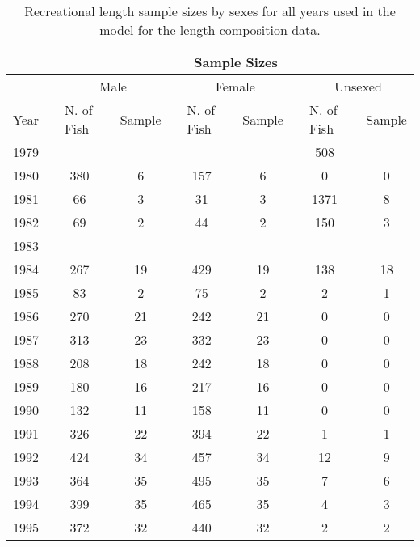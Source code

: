 \begingroup\fontsize{10}{12}\selectfont
\begingroup\fontsize{10}{12}\selectfont

\begin{table}[]
\caption{Recreational length sample sizes by sexes for all years used in the model for the length composition data.}
\label{tab:rec_length_sample}
\begin{tabular}{rlclclclclclc}
\hline
\multicolumn{1}{l}{} &  & \multicolumn{11}{c}{Sample Sizes} \\ \hline
\multicolumn{1}{l}{} &  & \multicolumn{3}{c}{Male} &  & \multicolumn{3}{c}{Female} &  & \multicolumn{3}{c}{Unsexed} \\ \cline{3-5} \cline{7-9} \cline{11-13} 
\multicolumn{1}{l}{Year} &  & \multicolumn{1}{l}{N. of  Fish} &  & \multicolumn{1}{l}{Sample} &  & \multicolumn{1}{l}{N. of Fish} &  & \multicolumn{1}{l}{Sample} &  & \multicolumn{1}{l}{N. of Fish} &  & \multicolumn{1}{l}{Sample} \\ \hline
1979 &  &  &  &  &  &  &  &  &  & 508 &  &  \\
1980 &  & 380 &  & 6 &  & 157 &  & 6 &  & 0 &  & 0 \\
1981 &  & 66 &  & 3 &  & 31 &  & 3 &  & 1371 &  & 8 \\
1982 &  & 69 &  & 2 &  & 44 &  & 2 &  & 150 &  & 3 \\
1983 &  &  &  &  &  &  &  &  &  &  &  &  \\
1984 &  & 267 &  & 19 &  & 429 &  & 19 &  & 138 &  & 18 \\
1985 &  & 83 &  & 2 &  & 75 &  & 2 &  & 2 &  & 1 \\
1986 &  & 270 &  & 21 &  & 242 &  & 21 & \multicolumn{1}{c}{} & 0 &  & 0 \\
1987 &  & 313 &  & 23 &  & 332 &  & 23 &  & 0 &  & 0 \\
1988 &  & 208 &  & 18 &  & 242 &  & 18 &  & 0 &  & 0 \\
1989 &  & 180 &  & 16 &  & 217 &  & 16 &  & 0 &  & 0 \\
1990 &  & 132 &  & 11 &  & 158 &  & 11 & \multicolumn{1}{c}{} & 0 &  & 0 \\
1991 &  & 326 &  & 22 &  & 394 &  & 22 & \multicolumn{1}{c}{} & 1 &  & 1 \\
1992 &  & 424 &  & 34 &  & 457 &  & 34 & \multicolumn{1}{c}{} & 12 &  & 9 \\
1993 &  & 364 &  & 35 &  & 495 &  & 35 &  & 7 &  & 6 \\
1994 &  & 399 &  & 35 &  & 465 &  & 35 &  & 4 &  & 3 \\
1995 &  & 372 &  & 32 &  & 440 &  & 32 &  & 2 &  & 2 \\

\end{tabular}
\end{table}

